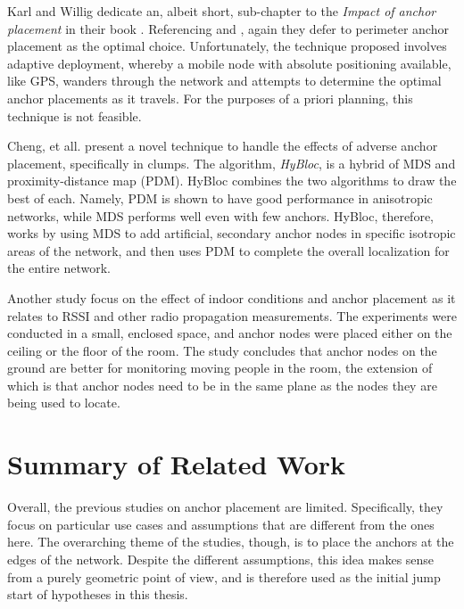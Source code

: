 Karl and Willig dedicate an, albeit short, sub-chapter to the \emph{Impact of anchor placement} in their book \cite[p. 247-248]{Karl}.  Referencing \cite{Doherty} and \cite{Savarese}, again they defer to perimeter anchor placement as the optimal choice.  Unfortunately, the technique proposed involves adaptive deployment, whereby a mobile node with absolute positioning available, like GPS, wanders through the network and attempts to determine the optimal anchor placements as it travels.  For the purposes of a priori planning, this technique is not feasible.

Cheng, et all.\cite{Cheng} present a novel technique to handle the effects of adverse anchor placement, specifically in clumps.  The algorithm, \emph{HyBloc}, is a hybrid of MDS and proximity-distance map (PDM)\cite{PDM}.  HyBloc combines the two algorithms to draw the best of each. Namely, PDM is shown to have good performance in anisotropic networks, while MDS performs well even with few anchors.  HyBloc, therefore, works by using MDS to add artificial, secondary anchor nodes in specific isotropic areas of the network, and then uses PDM to complete the overall localization for the entire network.

Another study focus on the effect of indoor conditions and anchor placement as it relates to RSSI and other radio propagation measurements\cite{Zemek}.  The experiments were conducted in a small, enclosed space, and anchor nodes were placed either on the ceiling or the floor of the room.  The study concludes that anchor nodes on the ground are better for monitoring moving people in the room, the extension of which is that anchor nodes need to be in the same plane as the nodes they are being used to locate.

\section{Summary of Related Work}

Overall, the previous studies on anchor placement are limited.  Specifically, they focus on particular use cases and assumptions that are different from the ones here. The overarching theme of the studies, though, is to place the anchors at the edges of the network.  Despite the different assumptions, this idea makes sense from a purely geometric point of view, and is therefore used as the initial jump start of hypotheses in this thesis.

